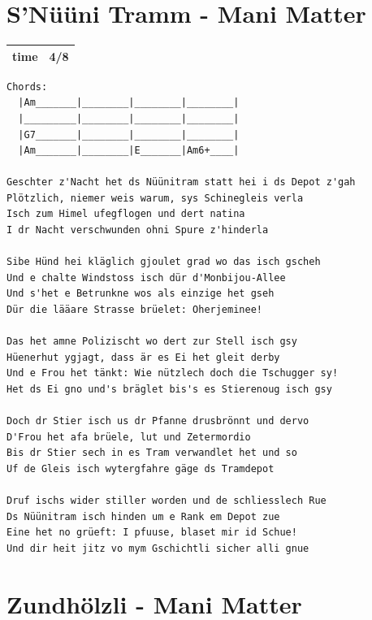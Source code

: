 \documentclass[
]{book}
\let\stdsection\section
\renewcommand\section{\clearpage\stdsection}
\begin{document}
\hypertarget{mundart-und-deutsch-nueni-tramm}{%
\section{S'Nüüni Tramm - Mani Matter}\label{mundart-und-deutsch-nueni-tramm}}

\begin{longtable}[]{@{}ll@{}}
\toprule
\endhead
time & 4/8\tabularnewline
\bottomrule
\end{longtable}

\begin{verbatim}
Chords:
  |Am_______|________|________|________|
  |_________|________|________|________|
  |G7_______|________|________|________|
  |Am_______|________|E_______|Am6+____|

Geschter z'Nacht het ds Nüünitram statt hei i ds Depot z'gah
Plötzlich, niemer weis warum, sys Schinegleis verla
Isch zum Himel ufegflogen und dert natina
I dr Nacht verschwunden ohni Spure z'hinderla

Sibe Hünd hei kläglich gjoulet grad wo das isch gscheh
Und e chalte Windstoss isch dür d'Monbijou-Allee
Und s'het e Betrunkne wos als einzige het gseh
Dür die lääare Strasse brüelet: Oherjeminee!

Das het amne Polizischt wo dert zur Stell isch gsy
Hüenerhut ygjagt, dass är es Ei het gleit derby
Und e Frou het tänkt: Wie nützlech doch die Tschugger sy!
Het ds Ei gno und's bräglet bis's es Stierenoug isch gsy

Doch dr Stier isch us dr Pfanne drusbrönnt und dervo
D'Frou het afa brüele, lut und Zetermordio
Bis dr Stier sech in es Tram verwandlet het und so
Uf de Gleis isch wytergfahre gäge ds Tramdepot

Druf ischs wider stiller worden und de schliesslech Rue
Ds Nüünitram isch hinden um e Rank em Depot zue
Eine het no grüeft: I pfuuse, blaset mir id Schue!
Und dir heit jitz vo mym Gschichtli sicher alli gnue

\end{verbatim}

\hypertarget{mundart-und-deutsch-s-zundhoelzli}{%
\section{Zundhölzli - Mani Matter}\label{mundart-und-deutsch-s-zundhoelzli}}
\end{document}
